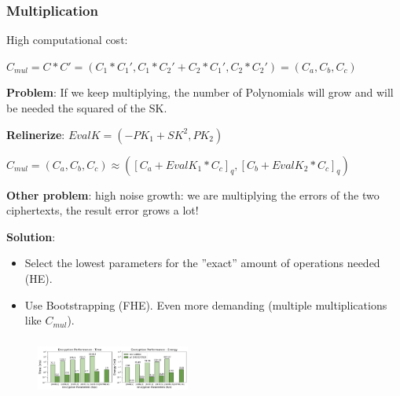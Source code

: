 \documentclass[10pt,handout]{beamer}
\begin{document}
\begin{frame}[noframenumbering]

    \frametitle{Multiplication}

    High computational cost:
    \vspace{-0.15cm}

    $C_{mul} = C*C' = (C_1*C_1',C_1*C_2'+C_2*C_1', C_2*C_2') = (C_a,C_b,C_c)$
    \vspace{-0.15cm}

    \textbf{Problem}: If we keep multiplying, the number of Polynomials will grow and will be needed
    the squared of the SK.

    \textbf{Relinerize}:
    $EvalK = (-PK_1+SK^2, PK_2)$

    $C_{mul} = (C_a, C_b, C_c)\approx ([C_a+EvalK_1*C_c]_q, [C_b+EvalK_2*C_c]_q)$

    \textbf{Other problem}: high noise growth: we are multiplying the errors of the two ciphertexts, the result error
    grows a lot!
    \vspace{-0.1cm}

    \textbf{Solution}: \vspace{-0.3cm}
    \begin{itemize} \vspace{-0.2cm}
        \item Select the lowest parameters for the ''exact'' amount  of operations needed (HE). \vspace{-0.2cm}
            \vspace{-0.25cm}
        \item Use Bootstrapping  (FHE). Even more demanding (multiple multiplications like $C_{mul}$).
    \end{itemize}
\end{frame}

\begin{frame}[noframenumbering]
\frametitle{}
\begin{figure}
    \includegraphics[width=0.45\textwidth]{SW_comp.png}
\end{figure}

\end{frame}


\begin{frame}[noframenumbering]
\frametitle{}

\end{frame}
\end{document}

